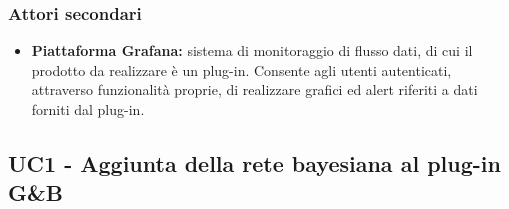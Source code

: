 \subsubsection*{Attori secondari}
\begin{itemize}
\item \textbf{Piattaforma Grafana:} sistema di monitoraggio di flusso dati, di cui il prodotto da realizzare è un plug-in. Consente agli utenti autenticati, attraverso funzionalità proprie, di realizzare grafici ed alert riferiti a dati forniti dal plug-in.
\end{itemize}


\subsection{UC1 - Aggiunta della rete bayesiana al plug-in G\&B}\label{UC1}

